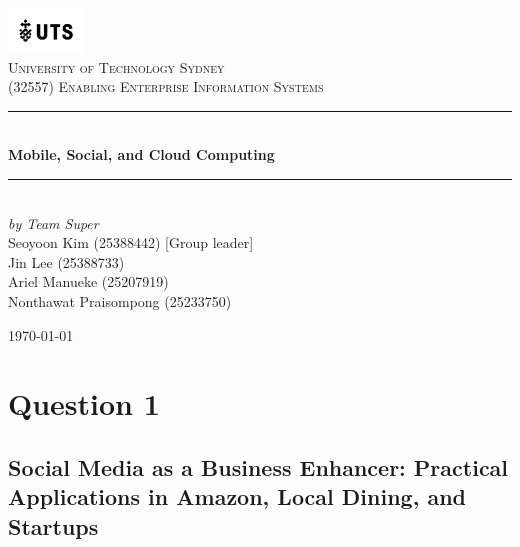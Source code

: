 \documentclass[12pt,a4paper]{article}
\begin{document}

\begin{titlepage}

\newcommand{\HRule}{\rule{\linewidth}{0.5mm}}
\center

\vspace*{1\baselineskip}
\includegraphics[width=0.15\textwidth]{images/UTS.png}\\
\textsc{\LARGE University of Technology Sydney}\\[2.0cm]
\textsc{\Large (32557) Enabling Enterprise Information Systems}\\[0.2cm]

\HRule\\[0.6cm]
{\huge\bfseries Mobile, Social, and Cloud Computing}\\[0.4cm]
\HRule\\[10cm]

\emph{by Team Super} \\
{ Seoyoon Kim (25388442) [Group leader] \\}
{ Jin Lee (25388733)  \\}
{ Ariel Manueke (25207919) \\}
{ Nonthawat Praisompong (25233750) \\}

\vfill
{\large\today}

\vfill

\end{titlepage}


\tableofcontents
\thispagestyle{nofooter}
\cleardoublepage

\pagebreak





\setcounter{page}{1}

\section{Question 1}
\subsection{Social Media as a Business Enhancer: Practical Applications in Amazon, Local Dining, and Startups}
\label{sec:Question 1}
\end{document}
